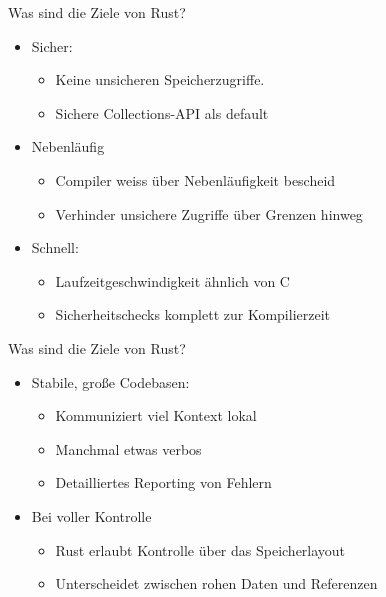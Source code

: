 \documentclass{beamer}
\begin{document}
\begin{frame}{Was sind die Ziele von Rust?}

	\begin{itemize}
		\item Sicher:
		      \begin{itemize}
			      \item
			            Keine unsicheren Speicherzugriffe.
			      \item
			            Sichere Collections-API als default
		      \end{itemize}
		\item<2->
		      Nebenläufig
		      \begin{itemize}
			      \item
			            Compiler weiss über Nebenläufigkeit bescheid
			      \item
			            Verhinder unsichere Zugriffe über Grenzen hinweg
		      \end{itemize}
		\item<3->
		      Schnell:
		      \begin{itemize}
			      \item
			            Laufzeitgeschwindigkeit ähnlich von C
			      \item
			            Sicherheitschecks komplett zur Kompilierzeit
		      \end{itemize}
	\end{itemize}
\end{frame}


\begin{frame}{Was sind die Ziele von Rust?}

	\begin{itemize}
		\item Stabile, große Codebasen:
		      \begin{itemize}
			      \item
			            Kommuniziert viel Kontext lokal
			      \item
			            Manchmal etwas verbos
			      \item
			            Detailliertes Reporting von Fehlern
		      \end{itemize}
		\item<2-> Bei voller Kontrolle
		      \begin{itemize}
			      \item
			            Rust erlaubt Kontrolle über das Speicherlayout
			      \item
			            Unterscheidet zwischen rohen Daten und Referenzen
		      \end{itemize}
	\end{itemize}
\end{frame}
\end{document}

